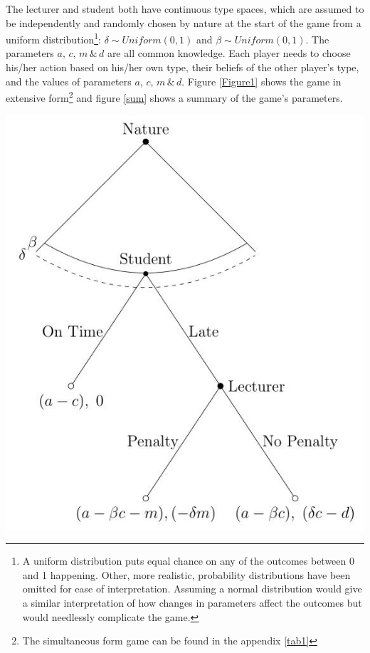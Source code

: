 \documentclass[11pt,preprint, authoryear]{elsarticle}
\numberwithin{equation}{section}
\numberwithin{figure}{section}
\numberwithin{table}{section}
\let\rmarkdownfootnote\footnote%
\def\footnote{\protect\rmarkdownfootnote}
\begin{document}
The lecturer and student both have continuous type spaces, which are
assumed to be independently and randomly chosen by nature at the start
of the game from a uniform distribution\footnote{A uniform distribution
  puts equal chance on any of the outcomes between 0 and 1 happening.
  Other, more realistic, probability distributions have been omitted for
  ease of interpretation. Assuming a normal distribution would give a
  similar interpretation of how changes in parameters affect the
  outcomes but would needlessly complicate the game.}:
\(\delta \sim Uniform(0,1)\) and \(\beta \sim Uniform(0,1)\). The
parameters \(a,\, c,\, m\, \&\, d\) are all common knowledge. Each
player needs to choose his/her action based on his/her own type, their
beliefs of the other player's type, and the values of parameters
\(a,\, c,\, m\, \&\, d\). Figure \ref{Figure1} shows the game in
extensive form\footnote{The simultaneous form game can be found in the
  appendix \ref{tab1}} and figure \ref{sum} shows a summary of the
game's parameters.

\begin{center}
\includegraphics[scale=1]{"img/continuous.jpg"}
\label{Figure1}
\end{center}
\end{document}
